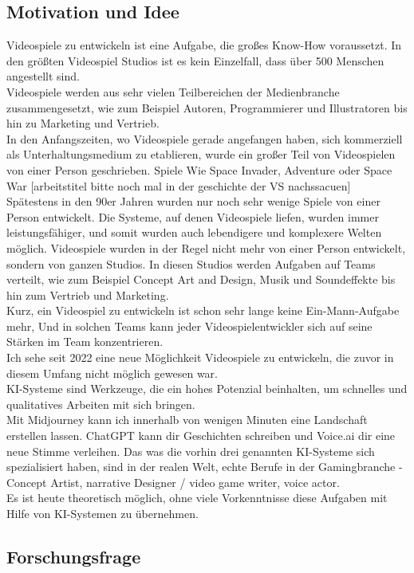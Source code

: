 \documentclass[12pt,a4paper,bibliography=totocnumbered,listof=totocnumbered]{scrartcl}
\begin{document}
\subsection{Motivation und Idee}
Videospiele zu entwickeln ist eine Aufgabe, die großes Know-How voraussetzt. In den größten Videospiel Studios ist es kein Einzelfall, dass über 500 Menschen angestellt sind.
\\
Videospiele werden aus sehr vielen Teilbereichen der Medienbranche zusammengesetzt, wie zum Beispiel Autoren, Programmierer und Illustratoren bis hin zu Marketing und Vertrieb.
\\
In den Anfangszeiten, wo Videospiele gerade angefangen haben, sich kommerziell als Unterhaltungsmedium zu etablieren, wurde ein großer Teil von Videospielen von einer Person geschrieben. Spiele Wie Space Invader, Adventure oder Space War [arbeitstitel bitte noch mal in der geschichte der VS nachssacuen]
\\
Spätestens in den 90er Jahren wurden nur noch sehr wenige Spiele von einer Person entwickelt. Die Systeme, auf denen Videospiele liefen, wurden immer leistungsfähiger, und somit wurden auch lebendigere und komplexere Welten möglich. Videospiele wurden in der Regel nicht mehr von einer Person entwickelt, sondern von ganzen Studios. In diesen Studios werden Aufgaben auf Teams verteilt, wie zum Beispiel Concept Art and Design, Musik und Soundeffekte bis hin zum Vertrieb und Marketing.
\\
Kurz, ein Videospiel zu entwickeln ist schon sehr lange keine Ein-Mann-Aufgabe mehr, Und in solchen Teams kann jeder Videospielentwickler sich auf seine Stärken im Team konzentrieren.
\\
Ich sehe seit 2022 eine neue Möglichkeit Videospiele zu entwickeln, die zuvor in diesem Umfang nicht möglich gewesen war.
\\
KI-Systeme sind Werkzeuge, die ein hohes Potenzial beinhalten, um schnelles und qualitatives Arbeiten mit sich bringen.
\\
Mit Midjourney kann ich innerhalb von wenigen Minuten eine Landschaft erstellen lassen. ChatGPT kann dir Geschichten schreiben und Voice.ai dir eine neue Stimme verleihen. Das was die vorhin drei genannten KI-Systeme sich spezialisiert haben, sind in der realen
Welt, echte Berufe in der Gamingbranche - Concept Artist, narrative Designer / video game writer, voice actor.
\\
Es ist heute theoretisch möglich, ohne viele Vorkenntnisse diese Aufgaben mit Hilfe von KI-Systemen zu übernehmen.
\subsection{Forschungsfrage}
\end{document}
